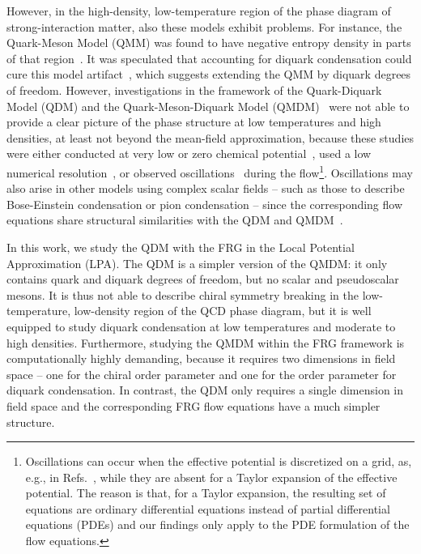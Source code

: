 \documentclass[
onecolumn,
aps,
prd,
amsmath,
amssymb,
nofootinbib
]{revtex4-2}
\begin{document}
However, in the high-density, low-temperature region of the phase diagram of strong-interaction matter, also these models exhibit problems.
For instance, the Quark-Meson Model (QMM) was found to have negative entropy density in parts of that region~\cite{Tripolt_2018}.
It was speculated that accounting for diquark condensation could cure this model artifact~\cite{Sedrakian:2017qpg}, which suggests extending the QMM by diquark degrees of freedom.
However, investigations in the framework of the Quark-Diquark Model (QDM) and the Quark-Meson-Diquark Model (QMDM)~\cite{Braun:2018svj,lakaschus2021inhomogeneous,stoll2025nonperturbative,andersen2024colorsuperconductivityspeedsound,Gholami:2026cgd,Mire:2026auc} were not able to provide a clear picture of the phase structure at low temperatures and high densities, at least not beyond the mean-field approximation, because these studies were either conducted at very low or zero chemical potential~\cite{Gholami:2026cgd}, used a low numerical resolution~\cite{lakaschus2021inhomogeneous}, or observed oscillations~\cite{stoll2025nonperturbative} during the flow\footnote{Oscillations can occur when the effective potential is discretized on a grid, as, e.g., in Refs.~\cite{stoll2025nonperturbative,lakaschus2021inhomogeneous}, while they are absent for a Taylor expansion of the effective potential. The reason is that, for a Taylor expansion, the resulting set of equations are ordinary differential equations instead of partial differential equations (PDEs) and our findings only apply to the PDE formulation of the flow equations.}.
Oscillations may also arise in other models using complex scalar fields -- such as those to describe Bose-Einstein condensation or pion condensation -- since the corresponding flow equations share structural similarities with the QDM and QMDM~\cite{Terazaki:2024evv,Svanes_2011}.


In this work, we study the QDM with the FRG in the Local Potential Approximation (LPA). 
The QDM is a simpler version of the QMDM: it only contains quark and diquark degrees of freedom, but no scalar and pseudoscalar mesons.
It is thus not able to describe chiral symmetry breaking in the low-temperature, low-density region of the QCD phase diagram, but it is well equipped to study diquark condensation at low temperatures and moderate to high densities.
Furthermore, studying the QMDM within the FRG framework is computationally highly demanding, because it requires two dimensions in field space -- one for the chiral order parameter and one for the order parameter for diquark condensation.
In contrast, the QDM only requires a single dimension in field space and the corresponding FRG flow equations have a much simpler structure. 
\end{document}
